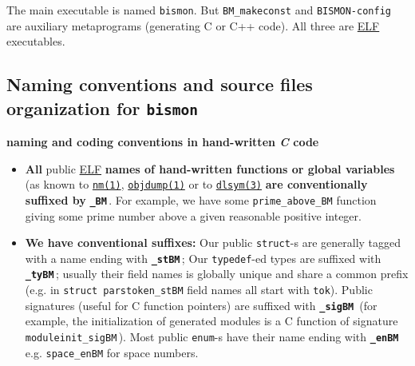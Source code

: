 \begin{appendices}
The main executable is named \texttt{bismon}. But
\texttt{BM\_makeconst} and \texttt{BISMON-config} are auxiliary
metaprograms (generating C or C++ code). All three are
\href{https://en.wikipedia.org/wiki/Executable_and_Linkable_Format}{ELF}
executables.

\medskip

\subsection{Naming conventions and source files organization for \texttt{bismon}}

\medskip

{\large \textbf{naming and coding conventions in hand-written \emph{C} code}}

\begin{itemize}

  \item \textbf{All} public
    \href{https://en.wikipedia.org/wiki/Executable_and_Linkable_Format}{ELF}
    \textbf{names of hand-written functions or global variables} (as
    known to
    \href{https://man7.org/linux/man-pages/man1/nm.1.html}{\texttt{nm(1)}},
    \href{https://man7.org/linux/man-pages/man1/objdump.1.html}{\texttt{objdump(1)}}
    or to
    \href{https://man7.org/linux/man-pages/man3/dlsym.3.html}{\texttt{dlsym(3)}}
    \textbf{are conventionally suffixed by}
           {\texttt{\textbf{\_BM}}}\,. For example, we have some
           \texttt{prime\_above\_BM} function giving some prime number
           above a given reasonable positive integer.

         \item \textbf{We have conventional suffixes:} Our public
            \texttt{struct}-s are generally tagged
           with a name ending with {\texttt{\textbf{\_stBM}}}\,; Our
           \texttt{typedef}-ed types are suffixed with
                  {\texttt{\textbf{\_tyBM}}}\,; usually their field
                  names is globally unique and share a common prefix
                  (e.g. in \texttt{struct parstoken\_stBM} field names
                  all start with \texttt{tok}). Public signatures
                  (useful for C function pointers) are suffixed with
                  {\texttt{\textbf{\_sigBM}}}\, (for example, the
                  initialization of generated modules is a C function
                  of signature \texttt{moduleinit\_sigBM}\,). Most
                  public \texttt{enum}-s have their name ending with
                  {\texttt{\textbf{\_enBM}}}\,
                  e.g. \texttt{space\_enBM} for space numbers.


\end{itemize}
\end{appendices}
